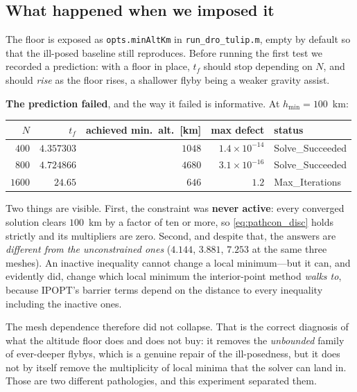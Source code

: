 \documentclass[11pt]{article}
\newcommand{\code}[1]{\texttt{#1}}
\begin{document}
\subsection{What happened when we imposed it}

The floor is exposed as \code{opts.minAltKm} in \code{run\_dro\_tulip.m}, empty
by default so that the ill-posed baseline still reproduces. Before running the
first test we recorded a prediction: with a floor in place, $t_f$ should stop
depending on $N$, and should \emph{rise} as the floor rises, a shallower flyby
being a weaker gravity assist.

\textbf{The prediction failed}, and the way it failed is informative. At
$h_{\min} = 100$~km:

\begin{center}
\begin{tabular}{rrrrl}
\toprule
$N$ & $t_f$ & achieved min.\ alt.\ [km] & max defect & status \\
\midrule
$400$  & $4.357303$  & $1048$ & $1.4\times10^{-14}$ & Solve\_Succeeded \\
$800$  & $4.724866$  & $4680$ & $3.1\times10^{-16}$ & Solve\_Succeeded \\
$1600$ & $24.65$     & $646$  & $1.2$               & Max\_Iterations \\
\bottomrule
\end{tabular}
\end{center}

Two things are visible. First, the constraint was \textbf{never active}: every
converged solution clears $100$~km by a factor of ten or more, so
\eqref{eq:pathcon_disc} holds strictly and its multipliers are zero. Second, and
despite that, the answers are \emph{different from the unconstrained ones}
($4.144$, $3.881$, $7.253$ at the same three meshes). An inactive inequality
cannot change a local minimum---but it can, and evidently did, change which
local minimum the interior-point method \emph{walks to}, because IPOPT's barrier
terms depend on the distance to every inequality including the inactive ones.

The mesh dependence therefore did not collapse. That is the correct diagnosis of
what the altitude floor does and does not buy: it removes the \emph{unbounded}
family of ever-deeper flybys, which is a genuine repair of the ill-posedness,
but it does not by itself remove the multiplicity of local minima that the
solver can land in. Those are two different pathologies, and this experiment
separated them.
\end{document}
